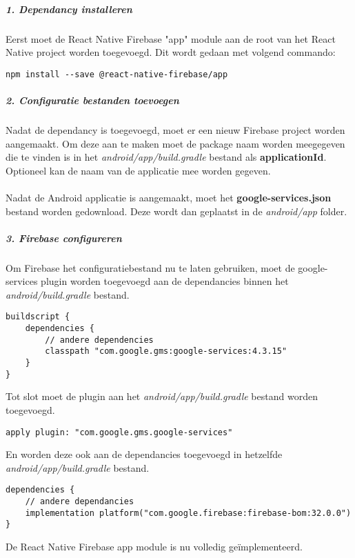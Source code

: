 \subparagraph{1. Dependancy installeren}
Eerst moet de React Native Firebase "app" module aan de root van het React Native project worden toegevoegd. 
Dit wordt gedaan met volgend commando:
\begin{verbatim}
npm install --save @react-native-firebase/app
\end{verbatim}

\subparagraph{2. Configuratie bestanden toevoegen}
Nadat de dependancy is toegevoegd, moet er een nieuw Firebase project worden aangemaakt. 
Om deze aan te maken moet de package naam worden meegegeven die te vinden is in het 
\textit{android/app/build.gradle} bestand als 
\textbf{applicationId}. Optioneel kan de naam van de applicatie mee worden gegeven.
\\\\
Nadat de Android applicatie is aangemaakt, moet het \textbf{google-services.json} bestand worden gedownload. 
Deze wordt dan geplaatst in de \textit{android/app} folder.

\subparagraph{3. Firebase configureren}
Om Firebase het configuratiebestand nu te laten gebruiken, moet de google-services plugin worden toegevoegd aan 
de dependancies binnen het \textit{android/build.gradle} bestand. 
\begin{verbatim}
buildscript {
    dependencies {
        // andere dependencies
        classpath "com.google.gms:google-services:4.3.15"
    }
}
\end{verbatim}
Tot slot moet de plugin aan het \textit{android/app/build.gradle} bestand worden toegevoegd.
\begin{verbatim}
apply plugin: "com.google.gms.google-services"
\end{verbatim}
En worden deze ook aan de dependancies toegevoegd in hetzelfde \textit{android/app/build.gradle} bestand.
\begin{verbatim}
dependencies {
    // andere dependancies
    implementation platform("com.google.firebase:firebase-bom:32.0.0")
}
\end{verbatim}
De React Native Firebase app module is nu volledig geïmplementeerd.